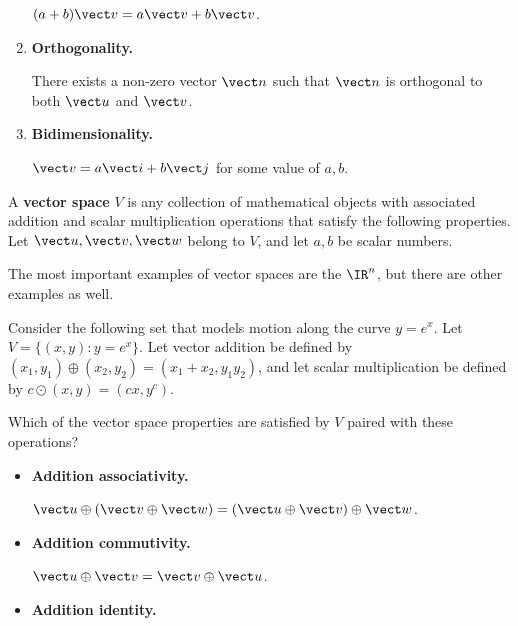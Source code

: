 \begin{applicationActivities}{1}{7}
\begin{activity}{20}
\begin{multicols}{2}
\begin{enumerate}
        \((a+b)\vect v=a\vect v+b\vect v\).
  \item \textbf{Orthogonality.}

        There exists a non-zero vector \(\vect n\) such that
        \(\vect n\) is orthogonal to both \(\vect u\) and \(\vect v\).
  \item \textbf{Bidimensionality.}

        \(\vect v=a\vect i+b\vect j\) for some value of \(a,b\).
\end{enumerate}
\end{multicols}
\end{activity}

\begin{definition}
  A \textbf{vector space} \(V\) is any collection of mathematical objects with
  associated addition and scalar multiplication operations that satisfy
  the following properties. Let \(\vect u,\vect v,\vect w\) belong to \(V\),
  and let \(a,b\) be scalar numbers.

  \vectorSpaceProperties
\end{definition}

\begin{definition}
  The most important examples of vector spaces are the  \(\IR^n\), but there are other examples as well.
\end{definition}

\begin{activity}{25}
  Consider the following set that models motion along the curve
  \(y=e^x\). Let \(V=\{(x,y):y=e^x\}\). Let vector addition be defined by
  \((x_1,y_1)\oplus (x_2,y_2)=(x_1+x_2,y_1y_2)\), and
  let scalar multiplication be defined by
  \(c\odot (x,y)=(cx,y^c)\).

  \begin{subactivity}
    Which of the vector space properties are satisfied by \(V\) paired with
    these operations?
    \begin{multicols}{2}
    \begin{itemize}
      \item \textbf{Addition associativity.}

            \(\vect u\oplus(\vect v\oplus\vect w)=
            (\vect u\oplus\vect v)\oplus\vect w\).
      \item \textbf{Addition commutivity.}

            \(\vect u\oplus\vect v=
            \vect v\oplus\vect u\).
      \item \textbf{Addition identity.}


\end{itemize}
\end{multicols}
\end{subactivity}
\end{activity}
\end{applicationActivities}
